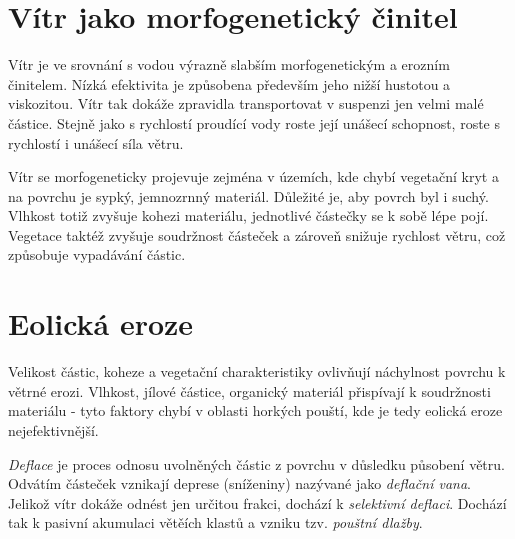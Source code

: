 
\section{Vítr jako morfogenetický činitel}
Vítr je ve srovnání s vodou výrazně slabším morfogenetickým a erozním činitelem. Nízká efektivita je způsobena především jeho nižší hustotou a viskozitou. Vítr tak dokáže zpravidla transportovat v suspenzi jen velmi malé částice. Stejně jako s rychlostí proudící vody roste její unášecí schopnost, roste s rychlostí i unášecí síla větru.

Vítr se morfogeneticky projevuje zejména v územích, kde chybí vegetační kryt a na povrchu je sypký, jemnozrnný materiál. Důležité je, aby povrch byl i suchý. Vlhkost totiž zvyšuje kohezi materiálu, jednotlivé částečky se k sobě lépe pojí. Vegetace taktéž zvyšuje soudržnost částeček a zároveň snižuje rychlost větru, což způsobuje vypadávání částic.

%
%
%
%
%
%


\section{Eolická eroze}
Velikost částic, koheze a vegetační charakteristiky ovlivňují náchylnost povrchu k větrné erozi. Vlhkost, jílové částice, organický materiál přispívají k soudržnosti materiálu - tyto faktory chybí v oblasti horkých pouští, kde je tedy eolická eroze nejefektivnější.

\emph{Deflace} je proces odnosu uvolněných částic z povrchu v důsledku působení větru. Odvátím částeček vznikají deprese (sníženiny) nazývané jako \emph{deflační vana}. Jelikož vítr dokáže odnést jen určitou frakci, dochází k \emph{selektivní deflaci}. Dochází tak k pasivní akumulaci větěích klastů a vzniku tzv. \emph{pouštní dlažby}.

